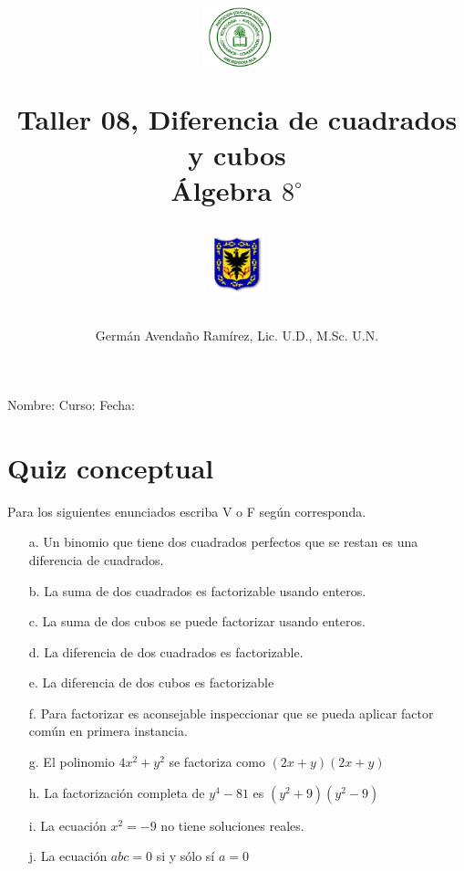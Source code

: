 \documentclass[10pt,twoside]{article}
\author{Germ\'an Avenda\~no Ram\'irez, Lic. U.D., M.Sc. U.N.}
\title{\begin{minipage}{.2\textwidth}
\includegraphics[height=1.75cm]{Images/logo-colegio.png}\end{minipage}
\begin{minipage}{.55\textwidth}
\begin{center}
Taller 08, Diferencia de cuadrados y cubos\\
Álgebra $8^{\circ}$
\end{center}
\end{minipage}\hfill
\begin{minipage}{.2\textwidth}
\includegraphics[height=1.75cm]{Images/logo-sed.png} 
\end{minipage}}
\date{}
\begin{document}
\maketitle
Nombre: \hrulefill Curso: \underline{\hspace*{44pt}} Fecha: \underline{\hspace*{2.5cm}}
\section*{Quiz conceptual}
Para los siguientes enunciados escriba V o F según corresponda.
\begin{enumerate}
\item[a.] Un binomio que tiene dos cuadrados perfectos que se restan es una diferencia de cuadrados.
\item[b.] La suma de dos cuadrados es factorizable usando enteros.
\item[c.] La suma de dos cubos se puede factorizar usando enteros.
\item[d.] La diferencia de dos cuadrados es factorizable.
\item[e.] La diferencia de dos cubos es factorizable
\item[f.] Para factorizar es aconsejable inspeccionar que se pueda aplicar factor común en primera instancia.
\item[g.] El polinomio $4x^{2}+y^{2}$ se factoriza como $(2x+y)(2x+y)$
\item[h.] La factorización completa de $y^{4}-81$ es $(y^{2}+9)(y^{2}-9)$
\item[i.] La ecuación $x^{2}=-9$ no tiene soluciones reales.
\item[j.] La ecuación $abc=0$ si y sólo sí $a=0$ 
\end{enumerate}
\end{document}
